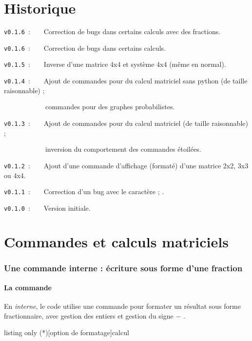 \documentclass[french,a4paper,11pt]{article}
\begin{document}
\part{Historique}

\verb|v0.1.6|~:~~~~Correction de bugs dans certains calculs avec des fractions.

\verb|v0.1.6|~:~~~~Correction de bugs dans certains calculs.

\verb|v0.1.5|~:~~~~Inverse d'une matrice 4x4 et système 4x4 (même en normal).

\verb|v0.1.4|~:~~~~Ajout de commandes pour du calcul matriciel sans python (de taille raisonnable) ;

\verb|      |~~~~~~commandes pour des graphes probabilistes.

\verb|v0.1.3|~:~~~~Ajout de commandes pour du calcul matriciel (de taille raisonnable) ;

\verb|      |~~~~~~inversion du comportement des commandes étoilées.

\verb|v0.1.2|~:~~~~Ajout d'une commande d'affichage (formaté) d'une matrice 2x2, 3x3 ou 4x4.

\verb|v0.1.1|~:~~~~Correction d'un bug avec le caractère \og ; \fg.

\verb|v0.1.0|~:~~~~Version initiale.

\pagebreak

\part{Commandes et calculs matriciels}

\section{Une commande interne : écriture sous forme d'une fraction}

\subsection{La commande}

\begin{cautionblock}
En \textit{interne}, le code utilise une commande pour formater un résultat sous forme fractionnaire, avec gestion des entiers et gestion du signe \og $-$ \fg.
\end{cautionblock}

\begin{PresentationCode}{listing only}
\ConvVersFrac(*)[option de formatage]{calcul}
\end{PresentationCode}
\end{document}
